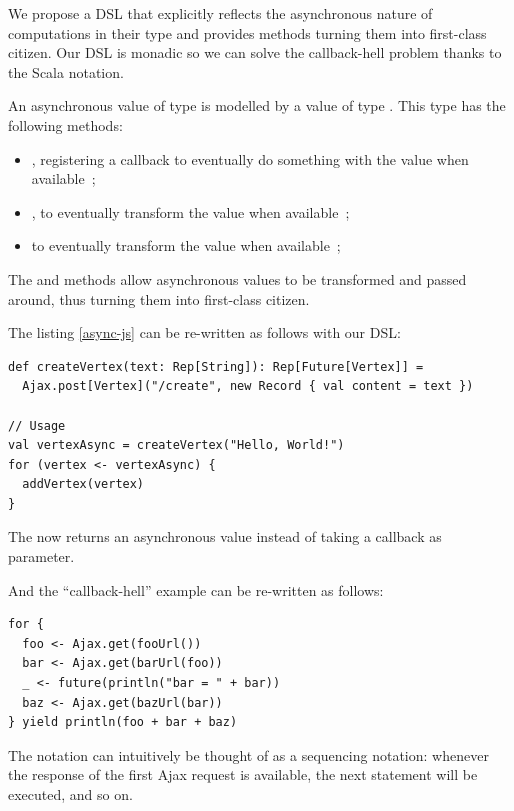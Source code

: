 \documentclass[american,english,runningheads]{llncs}
\begin{document}
We propose a DSL that explicitly reflects the asynchronous nature of computations in their type and provides methods turning them into first-class citizen. Our DSL is monadic so we can solve the callback-hell problem thanks to the Scala  notation.

An asynchronous value of type  is modelled by a value of type . This type has the following methods:
\begin{itemize}
\item {}, registering a callback to eventually do something with the value when available~;
\item {}, to eventually transform the value when available~;
\item {} to eventually transform the value when available~;
\end{itemize}

The  and  methods allow asynchronous values to be transformed and passed around, thus turning them into first-class citizen.

The listing \ref{async-js} can be re-written as follows with our DSL:

\begin{lstlisting}
def createVertex(text: Rep[String]): Rep[Future[Vertex]] =
  Ajax.post[Vertex]("/create", new Record { val content = text })

// Usage
val vertexAsync = createVertex("Hello, World!")
for (vertex <- vertexAsync) {
  addVertex(vertex)
}
\end{lstlisting}

The  now returns an asynchronous value instead of taking a callback as parameter.

And the “callback-hell” example can be re-written as follows:

\begin{lstlisting}
for {
  foo <- Ajax.get(fooUrl())
  bar <- Ajax.get(barUrl(foo))
  _ <- future(println("bar = " + bar))
  baz <- Ajax.get(bazUrl(bar))
} yield println(foo + bar + baz)
\end{lstlisting}

The  notation can intuitively be thought of as a sequencing notation: whenever the response of the first Ajax request is available, the next statement will be executed, and so on.
\end{document}
